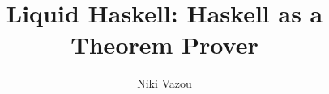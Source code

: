 \documentclass[12pt]{ucsddissertation}
\title{Liquid Haskell: Haskell as a Theorem Prover}
\author{Niki Vazou}
\begin{document}



\begin{comment}
\frontmatter
\maketitle
\makecopyright
\makesignature
\begin{dedication}

\end{dedication}
\begin{epigraph}
\vskip0pt plus.5fil
\setsinglespacing
{\flushright
Simplicity is the ultimate sophistication.
\vskip\baselineskip
\textit{Leonardo Da Vinci}\par}
\end{epigraph}


\tableofcontents
\listoffigures
\listoftables


\begin{acknowledgements}

\end{acknowledgements}

\begin{vita}

\end{vita}

\begin{dissertationabstract}

\end{dissertationabstract}

\mainmatter

\begin{dissertationintroduction}

\end{dissertationintroduction}








\backmatter
\end{comment}


\end{document}
